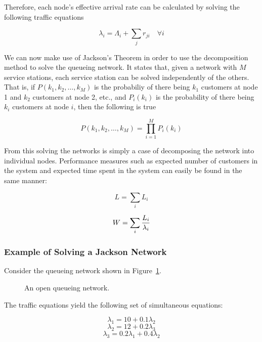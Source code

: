 \documentclass{article}
\begin{document}
Therefore, each node's effective arrival rate can be calculated by solving the following traffic equations

\begin{equation}
    \lambda_i = \Lambda_i + \sum_j r_{ji} \quad \forall i
\end{equation}

We can now make use of Jackson's Theorem \cite{jackson57} in order to use the decomposition method to solve the queueing network.
It states that, given a network with $M$ service stations, each service station can be solved independently of the others.
That is, if $P(k_1, k_2, \dotsc, k_M)$ is the probabiliy of there being $k_1$ customers at node 1 and $k_2$ customers at node 2, etc., and $P_i(k_i)$ is the probability of there being $k_i$ customers at node $i$, then the following is true

\begin{equation}
    P(k_1, k_2, \dotsc, k_M) = \prod_{i=1}^M P_i(k_i)
\end{equation}

From this solving the networks is simply a case of decomposing the network into individual nodes.
Performance measures such as expected number of customers in the system and expected time spent in the system can easily be found in the same manner:

\begin{equation}
    L = \sum_i L_i
\end{equation}

\begin{equation}
    W = \sum_i {L_i \over \lambda_i}
\end{equation}

\subsubsection{Example of Solving a Jackson Network}
Consider the queueing network shown in Figure~\ref{fig:jacksonnet}.

\begin{figure}[H]
    
    \caption{An open queueing network.}
    \label{fig:jacksonnet}
\end{figure}

The traffic equations yield the following set of simultaneous equations:

\begin{equation*}
\lambda_1 = 10 + 0.1 \lambda_2
\end{equation*}
\begin{equation*}
\lambda_2 = 12 + 0.2 \lambda_3
\end{equation*}
\begin{equation*}
\lambda_3 = 0.2 \lambda_1 + 0.4 \lambda_2
\end{equation*}
\end{document}
